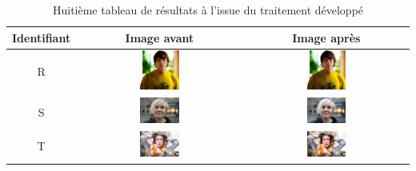 \documentclass[11pt, french]{report-rd-info}
\begin{document}
\begin{table}
\centering
\begin{tabular}{|c|c|c|}	
   \hline \textbf{Identifiant}  &  \textbf{Image avant}  &  \textbf{Image après}  \\ \hline 
   R & \includegraphics[width=0.25\textwidth]{Resultats/pr_avant} & \includegraphics[width=0.25\textwidth]{Resultats/pr_apres} \\ \hline   
   S & \includegraphics[width=0.25\textwidth]{Resultats/ps_avant} & \includegraphics[width=0.25\textwidth]{Resultats/ps_apres} \\ \hline
   T & \includegraphics[width=0.25\textwidth]{Resultats/pt_avant} & \includegraphics[width=0.25\textwidth]{Resultats/pt_apres} \\ \hline   
\end{tabular}
\caption{Huitième tableau de résultats à l'issue du traitement développé}
\label{tab:Resultats8}
\end{table}
\end{document}
